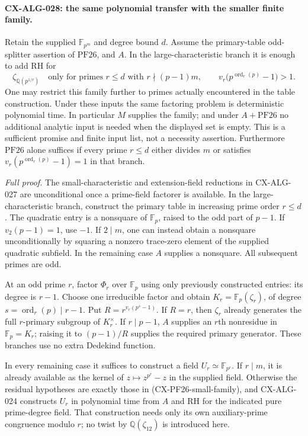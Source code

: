 \documentclass[11pt,a4paper]{article}
\begin{document}
\paragraph{CX-ALG-028: the same polynomial transfer with the smaller finite family.}
Retain the supplied $\mathbb F_{p^m}$ and degree bound $d$.
Assume the primary-table odd-splitter assertion of
$\mathrm{PF26}$, and $A$. In the large-characteristic branch it
is enough to add RH for
\[
 \zeta_{\mathbb Q(p^{1/r})}
 \quad\text{only for primes }r\le d\text{ with }
 r\nmid(p-1)m,\qquad
 v_r\bigl(p^{\operatorname{ord}_r(p)}-1\bigr)>1.
 \tag{CX-PF26-small-family}
\]
One may restrict this family further to primes actually encountered
in the table construction. Under these inputs the same factoring
problem is deterministic polynomial time. In particular $M$ supplies
the family; and under $A+\mathrm{PF26}$ no additional analytic input
is needed when the displayed set is empty. This is a sufficient
promise and finite input list, not a necessity assertion.
Furthermore $\mathrm{PF26}$ alone suffices if every prime $r\le d$
either divides $m$ or satisfies
$v_r(p^{\operatorname{ord}_r(p)}-1)=1$ in that branch.

\emph{Full proof.}
The small-characteristic and extension-field reductions in
CX-ALG-027 are unconditional once a prime-field factorer is
available. In the large-characteristic branch, construct the
primary table in increasing prime order $r\le d$. The quadratic
entry is a nonsquare of $\mathbb F_p$, raised to the odd part of
$p-1$. If $v_2(p-1)=1$, use $-1$. If $2\mid m$, one can
instead obtain a nonsquare unconditionally by squaring a nonzero
trace-zero element of the supplied quadratic subfield. In the
remaining case $A$ supplies a nonsquare. All subsequent primes
are odd.

At an odd prime $r$, factor $\Phi_r$ over $\mathbb F_p$ using
only previously constructed entries: its degree is $r-1$.
Choose one irreducible factor and obtain
$K_r=\mathbb F_p(\zeta_r)$, of degree
$s=\operatorname{ord}_r(p)\mid r-1$. Put
$R=r^{v_r(p^s-1)}$.
If $R=r$, then $\zeta_r$ already generates the full
$r$-primary subgroup of $K_r^\times$. If $r\mid p-1$,
$A$ supplies an $r$th nonresidue in $\mathbb F_p=K_r$;
raising it to $(p-1)/R$ supplies the required primary generator.
These branches use no extra Dedekind function.

In every remaining case it suffices to construct a field
$U_r\simeq\mathbb F_{p^r}$. If $r\mid m$, it is already
available as the kernel of $z\mapsto z^{p^r}-z$ in the supplied
field. Otherwise the residual hypotheses are exactly those in
(CX-PF26-small-family), and CX-ALG-024 constructs $U_r$ in
polynomial time from $A$ and RH for the indicated pure
prime-degree field. That construction needs only its own
auxiliary-prime congruence modulo $r$; no twist by
$\mathbb Q(\zeta_{12})$ is introduced here.
\end{document}
